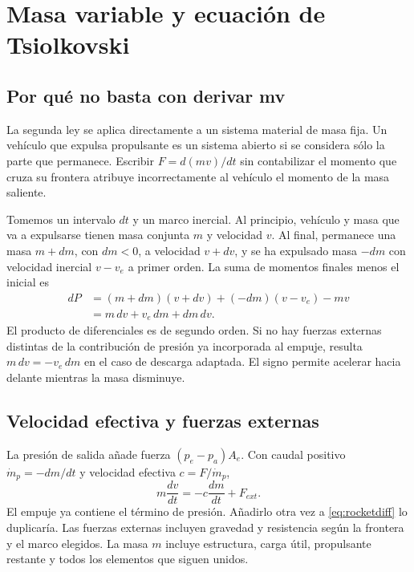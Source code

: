 \chapter{Masa variable y ecuación de Tsiolkovski}\label{ch:25}
\section{Por qué no basta con derivar mv}
La segunda ley se aplica directamente a un sistema material de masa fija. Un vehículo que expulsa propulsante es un sistema abierto si se considera sólo la parte que permanece. Escribir $F=d(mv)/dt$ sin contabilizar el momento que cruza su frontera atribuye incorrectamente al vehículo el momento de la masa saliente.

Tomemos un intervalo $dt$ y un marco inercial. Al principio, vehículo y masa que va a expulsarse tienen masa conjunta $m$ y velocidad $v$. Al final, permanece una masa $m+dm$, con $dm<0$, a velocidad $v+dv$, y se ha expulsado masa $-dm$ con velocidad inercial $v-v_e$ a primer orden. La suma de momentos finales menos el inicial es
\begin{align}
 dP&=(m+dm)(v+dv)+(-dm)(v-v_e)-mv\\
 &=m\,dv+v_e\,dm+dm\,dv.
\end{align}
El producto de diferenciales es de segundo orden. Si no hay fuerzas externas distintas de la contribución de presión ya incorporada al empuje, resulta $m\,dv=-v_e\,dm$ en el caso de descarga adaptada. El signo permite acelerar hacia delante mientras la masa disminuye.
\section{Velocidad efectiva y fuerzas externas}
La presión de salida añade fuerza $(p_e-p_a)A_e$. Con caudal positivo $\dot m_p=-dm/dt$ y velocidad efectiva $c=F/\dot m_p$,
\begin{equation}\label{eq:rocketdiff}
 m\frac{dv}{dt}=-c\frac{dm}{dt}+F_{ext}.
\end{equation}
El empuje ya contiene el término de presión. Añadirlo otra vez a \eqref{eq:rocketdiff} lo duplicaría. Las fuerzas externas incluyen gravedad y resistencia según la frontera y el marco elegidos. La masa $m$ incluye estructura, carga útil, propulsante restante y todos los elementos que siguen unidos.

